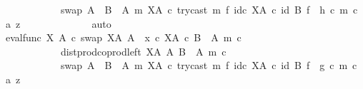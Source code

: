 \begin{isabellebody}
\ \ \ \ \ \ \ \ \ \ \ \ swap\ {\isacharparenleft}{\kern0pt}A\ {\isasymCoprod}\ {\isacharparenleft}{\kern0pt}B\ {\isasymsetminus}\ {\isacharparenleft}{\kern0pt}A{\isacharcomma}{\kern0pt}\ m{\isacharparenright}{\kern0pt}{\isacharparenright}{\kern0pt}{\isacharparenright}{\kern0pt}\ {\isacharparenleft}{\kern0pt}X\isactrlbsup A\isactrlesup {\isacharparenright}{\kern0pt}\ {\isasymcirc}\isactrlsub c\ try{\isacharunderscore}{\kern0pt}cast\ m\ {\isasymtimes}\isactrlsub f\ id\isactrlsub c\ {\isacharparenleft}{\kern0pt}X\isactrlbsup A\isactrlesup {\isacharparenright}{\kern0pt}{\isacharparenright}{\kern0pt}\ {\isasymcirc}\isactrlsub c\ {\isacharparenleft}{\kern0pt}id\ B\ {\isasymtimes}\isactrlsub f\ \ h{\isacharparenright}{\kern0pt}{\isacharparenright}{\kern0pt}\ {\isasymcirc}\isactrlsub c\ {\isasymlangle}m\ {\isasymcirc}\isactrlsub c\ a{\isacharcomma}{\kern0pt}\ z{\isasymrangle}{\isachardoublequoteclose}\isanewline
\ \ \ \ \ \ \ \ \ \ \ \ \isamarkupfalse%
\ auto\isanewline
\ \ \ \ \ \ \ \ \ \ \isamarkupfalse%
\ \isamarkupfalse%
\ {\isachardoublequoteopen}{\isacharparenleft}{\kern0pt}{\isacharparenleft}{\kern0pt}eval{\isacharunderscore}{\kern0pt}func\ X\ A\ {\isasymcirc}\isactrlsub c\ swap\ {\isacharparenleft}{\kern0pt}X\isactrlbsup A\isactrlesup {\isacharparenright}{\kern0pt}\ A{\isacharparenright}{\kern0pt}\ {\isasymamalg}\ {\isacharparenleft}{\kern0pt}x\ {\isasymcirc}\isactrlsub c\ {\isasymbeta}\isactrlbsub X\isactrlbsup A\isactrlesup \ {\isasymtimes}\isactrlsub c\ {\isacharparenleft}{\kern0pt}B\ {\isasymsetminus}\ {\isacharparenleft}{\kern0pt}A{\isacharcomma}{\kern0pt}\ m{\isacharparenright}{\kern0pt}{\isacharparenright}{\kern0pt}\isactrlesub {\isacharparenright}{\kern0pt}\ {\isasymcirc}\isactrlsub c\isanewline
\ \ \ \ \ \ \ \ \ \ \ \ dist{\isacharunderscore}{\kern0pt}prod{\isacharunderscore}{\kern0pt}coprod{\isacharunderscore}{\kern0pt}left\ {\isacharparenleft}{\kern0pt}X\isactrlbsup A\isactrlesup {\isacharparenright}{\kern0pt}\ A\ {\isacharparenleft}{\kern0pt}B\ {\isasymsetminus}\ {\isacharparenleft}{\kern0pt}A{\isacharcomma}{\kern0pt}\ m{\isacharparenright}{\kern0pt}{\isacharparenright}{\kern0pt}\ {\isasymcirc}\isactrlsub c\isanewline
\ \ \ \ \ \ \ \ \ \ \ \ swap\ {\isacharparenleft}{\kern0pt}A\ {\isasymCoprod}\ {\isacharparenleft}{\kern0pt}B\ {\isasymsetminus}\ {\isacharparenleft}{\kern0pt}A{\isacharcomma}{\kern0pt}\ m{\isacharparenright}{\kern0pt}{\isacharparenright}{\kern0pt}{\isacharparenright}{\kern0pt}\ {\isacharparenleft}{\kern0pt}X\isactrlbsup A\isactrlesup {\isacharparenright}{\kern0pt}\ {\isasymcirc}\isactrlsub c\ try{\isacharunderscore}{\kern0pt}cast\ m\ {\isasymtimes}\isactrlsub f\ id\isactrlsub c\ {\isacharparenleft}{\kern0pt}X\isactrlbsup A\isactrlesup {\isacharparenright}{\kern0pt}{\isacharparenright}{\kern0pt}\ {\isasymcirc}\isactrlsub c\ {\isacharparenleft}{\kern0pt}id\ B\ {\isasymtimes}\isactrlsub f\ \ g{\isacharparenright}{\kern0pt}\ {\isasymcirc}\isactrlsub c\ {\isasymlangle}m\ {\isasymcirc}\isactrlsub c\ a{\isacharcomma}{\kern0pt}\ z{\isasymrangle}\isanewline

\end{isabellebody}
